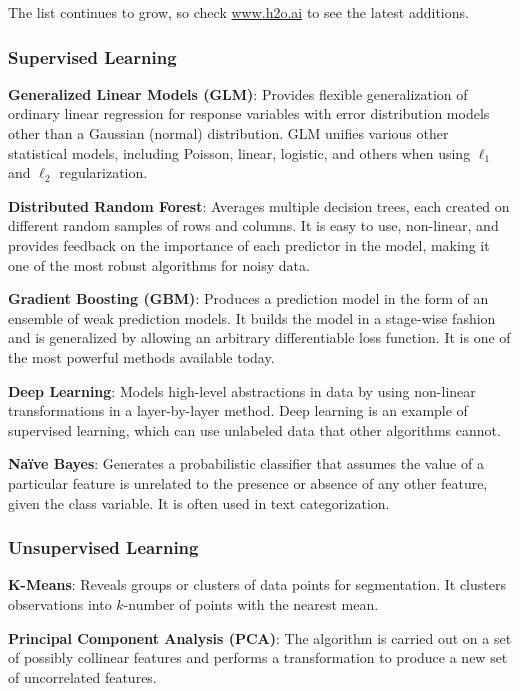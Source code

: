 {The list continues to grow, so check \url{www.h2o.ai} to see the latest additions. 

\subsubsection{Supervised Learning}


{\textbf{Generalized Linear Models (GLM)}}: Provides flexible generalization of ordinary linear regression for response variables with error distribution models other than a Gaussian (normal) distribution. GLM unifies various other statistical models, including Poisson, linear, logistic, and others when using $\ell_1$ and $\ell_2$ regularization.

{\textbf{Distributed Random Forest}}: Averages multiple decision trees, each created on different random samples of rows and columns. It is easy to use, non-linear, and provides feedback on the importance of each predictor in the model, making it one of the most robust algorithms for noisy data.

{\textbf{Gradient Boosting (GBM)}}: Produces a prediction model in the form of an ensemble of weak prediction models. It builds the model in a stage-wise fashion and is generalized by allowing an arbitrary differentiable loss function. It is one of the most powerful methods available today.

{\textbf{Deep Learning}}: Models high-level abstractions in data by using non-linear transformations in a layer-by-layer method. Deep learning is an example of supervised learning, which can use unlabeled data that other algorithms cannot.

{\textbf{Na\"{i}ve Bayes}}: Generates a probabilistic classifier that assumes the value of a particular feature is unrelated to the presence or absence of any other feature, given the class variable. It is often used in text categorization.

\subsubsection{Unsupervised Learning}
{\textbf{K-Means}}: Reveals groups or clusters of data points for segmentation. It clusters observations into $k$-number of points with the nearest mean.

{\textbf{Principal Component Analysis (PCA)}}: The algorithm is carried out on a set of possibly collinear features and performs a transformation to produce a new set of uncorrelated features.

}
